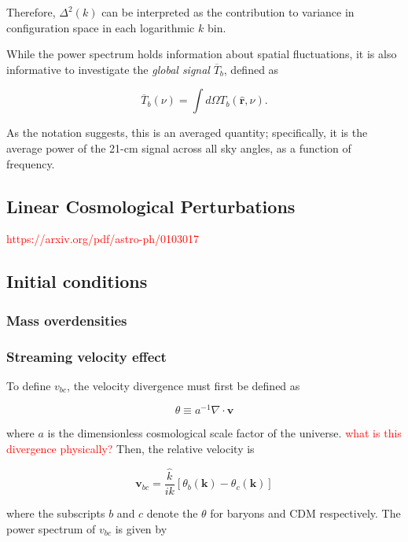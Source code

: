 \documentclass[floats,floatfix,showpacs,amssymb,prd,superscriptaddress,nofootinbib]{revtex4-2} %
\newcommand{\red}{\textcolor{red}}
\begin{document}
\noindent Therefore, $\Delta^2 (k)$ can be interpreted as the contribution to variance in configuration space in each logarithmic $k$ bin.

While the power spectrum holds information about spatial fluctuations, it is also informative to investigate the \textit{global signal} $\overline{T}_b$, defined as 

\begin{equation}
    \overline{T}_b (\nu) = \int d\Omega T_b (\hat{\textbf{r}}, \nu).
\end{equation}

\noindent As the notation suggests, this is an averaged quantity; specifically, it is the average power of the 21-cm signal across all sky angles, as a function of frequency.


\subsection{Linear Cosmological Perturbations}
\red{https://arxiv.org/pdf/astro-ph/0103017}
\subsection{Initial conditions}
\subsubsection{Mass overdensities}
\subsubsection{Streaming velocity effect}

To define $v_{bc}$, the velocity divergence must first be defined as 

\begin{equation}
    \theta \equiv a^{-1} \nabla \cdot \textbf{v}
    \label{eq:velocity_divergence}
\end{equation}

\noindent where $a$ is the dimensionless cosmological scale factor of the universe. \red{what is this divergence physically?} Then, the relative velocity is

\begin{equation}
    \textbf{v}_{bc} = \frac{\hat{k}}{ik} \left[ \theta_b (\textbf{k}) - \theta_c (\textbf{k}) \right]
    \label{eq:vbc_definition}
\end{equation}

\noindent where the subscripts $b$ and $c$ denote the $\theta$ for baryons and CDM respectively. The power spectrum of $v_{bc}$ is given by 
\end{document}
